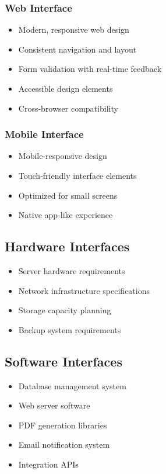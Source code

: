 \documentclass[12pt,a4paper]{article}
\begin{document}
\subsubsection{Web Interface}
\begin{itemize}
    \item Modern, responsive web design
    \item Consistent navigation and layout
    \item Form validation with real-time feedback
    \item Accessible design elements
    \item Cross-browser compatibility
\end{itemize}

\subsubsection{Mobile Interface}
\begin{itemize}
    \item Mobile-responsive design
    \item Touch-friendly interface elements
    \item Optimized for small screens
    \item Native app-like experience
\end{itemize}

\subsection{Hardware Interfaces}
\begin{itemize}
    \item Server hardware requirements
    \item Network infrastructure specifications
    \item Storage capacity planning
    \item Backup system requirements
\end{itemize}

\subsection{Software Interfaces}
\begin{itemize}
    \item Database management system
    \item Web server software
    \item PDF generation libraries
    \item Email notification system
    \item Integration APIs
\end{itemize}
\end{document}
